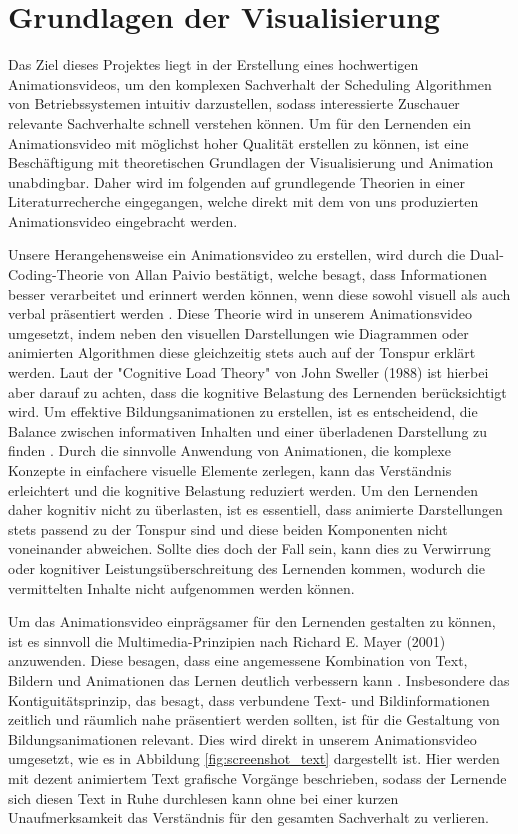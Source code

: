 
\chapter{Grundlagen der Visualisierung}
Das Ziel dieses Projektes liegt in der Erstellung eines hochwertigen Animationsvideos, um den komplexen Sachverhalt der Scheduling Algorithmen von Betriebssystemen intuitiv darzustellen, sodass interessierte Zuschauer relevante Sachverhalte schnell verstehen können. Um für den Lernenden ein Animationsvideo mit möglichst hoher Qualität erstellen zu können, ist eine Beschäftigung mit theoretischen Grundlagen der Visualisierung und Animation unabdingbar. Daher wird im folgenden auf grundlegende Theorien in einer Literaturrecherche eingegangen, welche direkt mit dem von uns produzierten Animationsvideo eingebracht werden. 

Unsere Herangehensweise ein Animationsvideo zu erstellen, wird durch die Dual-Coding-Theorie von Allan Paivio bestätigt, welche besagt, dass Informationen besser verarbeitet und erinnert werden können, wenn diese sowohl visuell als auch verbal präsentiert werden \autocite{paivio_dual_1991}. Diese Theorie wird in unserem Animationsvideo umgesetzt, indem neben den visuellen Darstellungen wie Diagrammen oder animierten Algorithmen diese gleichzeitig stets auch auf der Tonspur erklärt werden. Laut der "Cognitive Load Theory" von John Sweller (1988) ist hierbei aber darauf zu achten, dass die kognitive Belastung des Lernenden berücksichtigt wird. Um effektive Bildungsanimationen zu erstellen, ist es entscheidend, die Balance zwischen informativen Inhalten und einer überladenen Darstellung zu finden \autocite{sweller_cognitive_2011}. Durch die sinnvolle Anwendung von Animationen, die komplexe Konzepte in einfachere visuelle Elemente zerlegen, kann das Verständnis erleichtert und die kognitive Belastung reduziert werden. Um den Lernenden daher kognitiv nicht zu überlasten, ist es essentiell, dass animierte Darstellungen stets passend zu der Tonspur sind und diese beiden Komponenten nicht voneinander abweichen. Sollte dies doch der Fall sein, kann dies zu Verwirrung oder kognitiver Leistungsüberschreitung des Lernenden kommen, wodurch die vermittelten Inhalte nicht aufgenommen werden können. 

Um das Animationsvideo einprägsamer für den Lernenden gestalten zu können, ist es sinnvoll die Multimedia-Prinzipien nach Richard E. Mayer (2001) anzuwenden. Diese besagen, dass eine angemessene Kombination von Text, Bildern und Animationen das Lernen deutlich verbessern kann \autocite{mayer_multimedia_2002}. Insbesondere das Kontiguitätsprinzip, das besagt, dass verbundene Text- und Bildinformationen zeitlich und räumlich nahe präsentiert werden sollten, ist für die Gestaltung von Bildungsanimationen relevant. Dies wird direkt in unserem Animationsvideo umgesetzt, wie es in Abbildung \ref{fig:screenshot_text} dargestellt ist. Hier werden mit dezent animiertem Text grafische Vorgänge beschrieben, sodass der Lernende sich diesen Text in Ruhe durchlesen kann ohne bei einer kurzen Unaufmerksamkeit das Verständnis für den gesamten Sachverhalt zu verlieren. 

